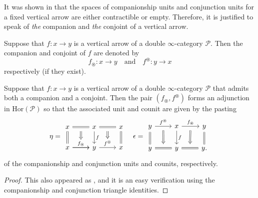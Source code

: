 \documentclass[a4paper, 11pt]{amsart}
\numberwithin{theorem}{section}
\theoremstyle{definition}
\renewcommand{\P}{\mathscr{P}}
\newcommand{\Hor}{\mathrm{Hor}}
\begin{document}
\begin{remark}
	It was shown in \cite{Comp} that the spaces of companionship units and conjunction units for a fixed vertical arrow are either contractible or empty. Therefore, it is justified 
	to speak of \textit{the} companion and \textit{the} conjoint of a vertical arrow.
\end{remark}


\begin{notation}\label{not.comp-conj}
	Suppose that $f:x\rightarrow y$ is a vertical arrow 
	of a double $\infty$-category $\P$. Then the companion and conjoint of  $f$ 
	are denoted by 
	$$
	f_\circledast : x \rightarrow y \quad \text{and} \quad f^\circledast : y \rightarrow x
	$$
	respectively (if they exist).
\end{notation}

\begin{proposition}\label{prop.conj-comp-adjunction}
	Suppose that $f : x \to y$ is a vertical arrow of a double $\infty$-category $\P$ that admits both a companion and a conjoint. Then the pair $(f_\circledast, f^\circledast)$ forms an adjunction 
	in $\Hor(\P)$ so that the associated unit and counit are given by the pasting
	\[
		\eta = \begin{tikzcd}
			x \arrow[r, equal, ""name=h1]\arrow[d, equal] & x \arrow[r, equal, ""name=h3] \arrow[d, "f"] & x \arrow[d,equal] \\
			x \arrow[r, "f_\circledast"name=h2] \arrow[r] & y \arrow[r, "f^\circledast"name=h4] & x 
			\arrow[from=h1,to=h2, Rightarrow, shorten <= 6pt]
			\arrow[from=h3,to=h4, Rightarrow, shorten <= 6pt]
		\end{tikzcd}
		\quad 
		\epsilon = \begin{tikzcd}
			y \arrow[r, "f^\circledast"name=f]\arrow[d, equal] & x \arrow[r, "f_\circledast"name=f2]\arrow[d, "f" ] & y \arrow[d, equal] \\
			y \arrow[r, equal,""'name=t] & y \arrow[r, equal,""'name=t2] & y.
			\arrow[from=f,to=t,Rightarrow, shorten <= 6pt, shorten >= 6pt]
			\arrow[from=f2,to=t2,Rightarrow, shorten <= 6pt, shorten >= 6pt]
		\end{tikzcd} 
	\]
	of the companionship and conjunction units and counits, respectively.
\end{proposition}
\begin{proof}
	This also appeared as \cite[Proposition 4.8]{Comp}, and it is an easy verification using the companionship and conjunction triangle identities.
\end{proof}
\end{document}
